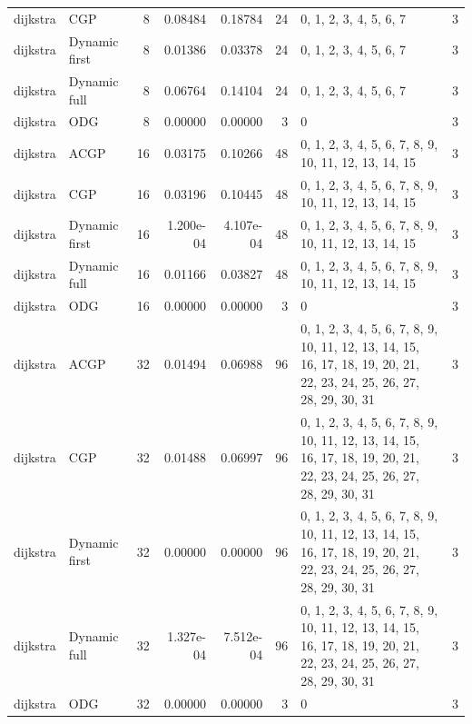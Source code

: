 \documentclass[10pt,a4paper]{article}
\begin{document}
\begin{longtable}{@{}p{23mm}p{29mm}rrrrp{36mm}r@{}}
dijkstra & CGP & 8 & 0.08484 & 0.18784 & 24 & 0, 1, 2, 3, 4, 5, 6, 7 & 3 \\
dijkstra & Dynamic first & 8 & 0.01386 & 0.03378 & 24 & 0, 1, 2, 3, 4, 5, 6, 7 & 3 \\
dijkstra & Dynamic full & 8 & 0.06764 & 0.14104 & 24 & 0, 1, 2, 3, 4, 5, 6, 7 & 3 \\
dijkstra & ODG & 8 & 0.00000 & 0.00000 & 3 & 0 & 3 \\
dijkstra & ACGP & 16 & 0.03175 & 0.10266 & 48 & 0, 1, 2, 3, 4, 5, 6, 7, 8, 9, 10, 11, 12, 13, 14, 15 & 3 \\
dijkstra & CGP & 16 & 0.03196 & 0.10445 & 48 & 0, 1, 2, 3, 4, 5, 6, 7, 8, 9, 10, 11, 12, 13, 14, 15 & 3 \\
dijkstra & Dynamic first & 16 & 1.200e-04 & 4.107e-04 & 48 & 0, 1, 2, 3, 4, 5, 6, 7, 8, 9, 10, 11, 12, 13, 14, 15 & 3 \\
dijkstra & Dynamic full & 16 & 0.01166 & 0.03827 & 48 & 0, 1, 2, 3, 4, 5, 6, 7, 8, 9, 10, 11, 12, 13, 14, 15 & 3 \\
dijkstra & ODG & 16 & 0.00000 & 0.00000 & 3 & 0 & 3 \\
dijkstra & ACGP & 32 & 0.01494 & 0.06988 & 96 & 0, 1, 2, 3, 4, 5, 6, 7, 8, 9, 10, 11, 12, 13, 14, 15, 16, 17, 18, 19, 20, 21, 22, 23, 24, 25, 26, 27, 28, 29, 30, 31 & 3 \\
dijkstra & CGP & 32 & 0.01488 & 0.06997 & 96 & 0, 1, 2, 3, 4, 5, 6, 7, 8, 9, 10, 11, 12, 13, 14, 15, 16, 17, 18, 19, 20, 21, 22, 23, 24, 25, 26, 27, 28, 29, 30, 31 & 3 \\
dijkstra & Dynamic first & 32 & 0.00000 & 0.00000 & 96 & 0, 1, 2, 3, 4, 5, 6, 7, 8, 9, 10, 11, 12, 13, 14, 15, 16, 17, 18, 19, 20, 21, 22, 23, 24, 25, 26, 27, 28, 29, 30, 31 & 3 \\
dijkstra & Dynamic full & 32 & 1.327e-04 & 7.512e-04 & 96 & 0, 1, 2, 3, 4, 5, 6, 7, 8, 9, 10, 11, 12, 13, 14, 15, 16, 17, 18, 19, 20, 21, 22, 23, 24, 25, 26, 27, 28, 29, 30, 31 & 3 \\
dijkstra & ODG & 32 & 0.00000 & 0.00000 & 3 & 0 & 3 \\
\end{longtable}\normalsize\setlength{\tabcolsep}{6pt}
\clearpage
\end{document}
